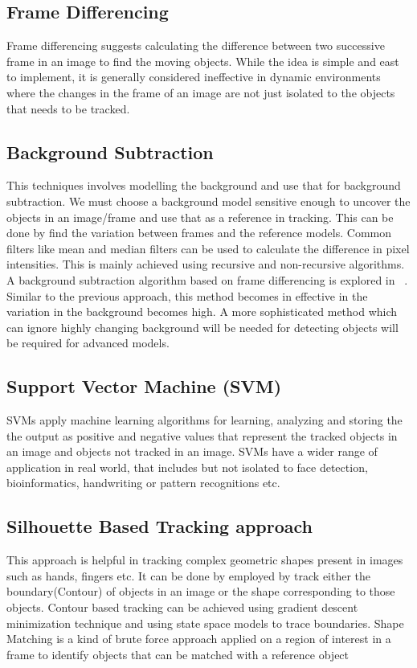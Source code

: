 \documentclass[10pt,twocolumn,letterpaper]{article}
\begin{document}

\subsection{Frame Differencing}
Frame differencing suggests calculating the difference between two successive frame in an image to find the moving objects. While the idea is simple and east to implement, it is generally considered ineffective in dynamic environments where the changes in the frame of an image are not just isolated to the objects that needs to be tracked.

\subsection{Background Subtraction}
This techniques involves modelling the background and use that for background subtraction. We must choose a background model sensitive enough to uncover the objects in an image/frame and use that as a reference in tracking. This can be done by find the variation between frames and the reference models. Common filters like mean and median filters can be used to calculate the difference in pixel intensities. This is mainly achieved using recursive and non-recursive algorithms. A background subtraction algorithm based on frame differencing is explored in ~\cite{literaturereview}.  Similar to the previous approach, this method becomes in effective in the variation in the background becomes high. A more sophisticated method which can ignore highly changing  background will be needed for detecting objects will be required for advanced models.

\subsection{Support Vector Machine (SVM)}
SVMs apply machine learning algorithms for learning, analyzing and storing the the output as positive and negative values that represent the tracked objects in an image and objects not tracked in an image. SVMs have a wider range of application in real world, that includes but not isolated to face detection, bioinformatics, handwriting or pattern recognitions etc.

\subsection{Silhouette Based Tracking approach}
This approach is helpful in tracking complex geometric shapes present in images such as hands, fingers etc. It can be done by employed by track either the boundary(Contour) of objects in an image or the shape corresponding to those objects. Contour based tracking can be achieved using gradient descent minimization technique and using state space models to trace boundaries. Shape Matching is a kind of brute force approach applied on a region of interest in a frame to identify objects that can be matched with a reference object
\end{document}
